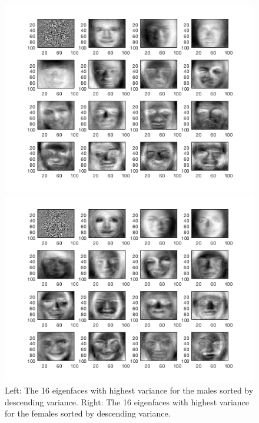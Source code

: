 \begin{figure}[ht!]
    \centering
    \begin{minipage}{0.49\textwidth}
    \includegraphics[width=1\linewidth]{fig/M_PCA.png}
    \end{minipage}
    \begin{minipage}{0.49\textwidth}
    \includegraphics[width=1\linewidth]{fig/F_PCA.png}
    \end{minipage}
    \caption{Left: The 16 eigenfaces with highest variance for the males sorted by descending variance. Right: The 16 eigenfaces with highest variance for the females sorted by descending variance.}
    \label{fig:PCA}
\end{figure}

